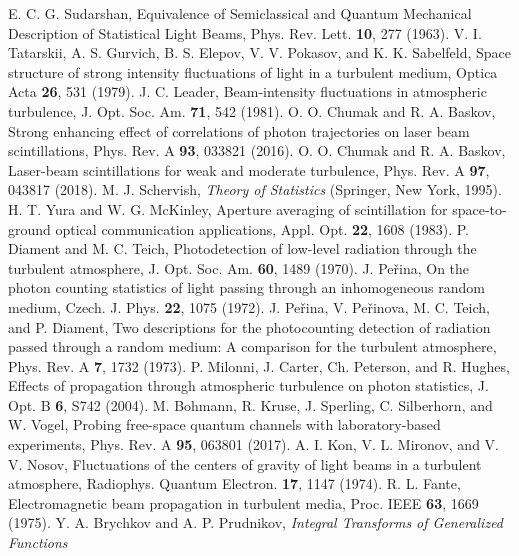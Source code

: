 \documentclass[aps,pra,twocolumn,a4paper,nofootinbib,preprintnumbers] {revtex4-1}
\begin{document}
\begin{thebibliography}{99}
	E. C. G. Sudarshan,
	Equivalence of Semiclassical and Quantum Mechanical Description of Statistical Light Beams,
	Phys. Rev. Lett. \textbf{10}, 277 (1963).
	V. I. Tatarskii, A. S. Gurvich, B. S. Elepov, V. V. Pokasov, and  K. K. Sabelfeld,
	Space structure of strong intensity fluctuations of light in a turbulent medium,
	Optica Acta \textbf{26}, 531 (1979).
	J. C. Leader,
	Beam-intensity fluctuations in atmospheric turbulence,
	J. Opt. Soc. Am. \textbf{71}, 542 (1981).
	O. O. Chumak and R. A. Baskov,
	Strong enhancing effect of correlations of photon trajectories on laser beam scintillations,
	Phys. Rev. A \textbf{93}, 033821 (2016).
	O. O. Chumak and R. A. Baskov,
	Laser-beam scintillations for weak and moderate turbulence,
    Phys. Rev. A \textbf{97}, 043817 (2018).
        M. J. Schervish,
        \textit{Theory of Statistics}
        (Springer, New York, 1995).
	H. T. Yura and W. G. McKinley,
	Aperture averaging of scintillation for space-to-ground optical communication applications,
	Appl. Opt. \textbf{22}, 1608 (1983).
	P. Diament and M. C. Teich,
	Photodetection of low-level radiation through the turbulent atmosphere,
	J. Opt. Soc. Am. \textbf{60}, 1489 (1970).
	J. Pe\v{r}ina,
	On the photon counting statistics of light passing through an inhomogeneous random medium,
	Czech. J. Phys. \textbf{22}, 1075 (1972).
	J. Pe\v{r}ina, V. Pe\v{r}inova, M. C. Teich, and P. Diament,
	Two descriptions for the photocounting detection of radiation passed through a random medium: A comparison for the turbulent atmosphere,
	Phys. Rev. A \textbf{7}, 1732 (1973).
	P. Milonni, J. Carter, Ch. Peterson, and R. Hughes,
	Effects of propagation through atmospheric turbulence on photon statistics,
	J. Opt. B \textbf{6}, S742 (2004).
	M. Bohmann, R. Kruse, J. Sperling, C. Silberhorn, and W. Vogel,
	Probing free-space quantum channels with laboratory-based experiments,
	Phys. Rev. A \textbf{95}, 063801 (2017).
        A. I. Kon, V. L. Mironov, and V. V. Nosov,
        Fluctuations of the centers of gravity of light beams in a turbulent atmosphere,
        Radiophys. Quantum Electron. \textbf{17}, 1147 (1974).
	R. L. Fante,
	Electromagnetic beam propagation in turbulent media,
	Proc. IEEE \textbf{63}, 1669 (1975).
        Y. A. Brychkov and A. P. Prudnikov,
        \textit{Integral Transforms of Generalized Functions}

\end{thebibliography}
\end{document}
